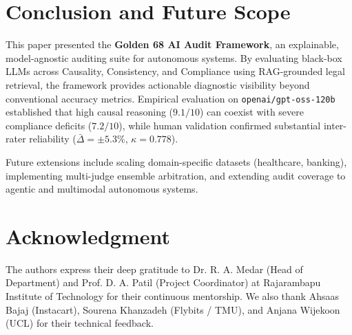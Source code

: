 \documentclass[conference]{IEEEtran}
\begin{document}
\section{Conclusion and Future Scope}
\label{sec:conclusion}

This paper presented the \textbf{Golden 68 AI Audit Framework}, an explainable, model-agnostic auditing suite for autonomous systems. By evaluating black-box LLMs across Causality, Consistency, and Compliance using RAG-grounded legal retrieval, the framework provides actionable diagnostic visibility beyond conventional accuracy metrics. Empirical evaluation on \texttt{openai/gpt-oss-120b} established that high causal reasoning ($9.1/10$) can coexist with severe compliance deficits ($7.2/10$), while human validation confirmed substantial inter-rater reliability ($\bar{\Delta} = \pm 5.3\%$, $\kappa = 0.778$).

Future extensions include scaling domain-specific datasets (healthcare, banking), implementing multi-judge ensemble arbitration, and extending audit coverage to agentic and multimodal autonomous systems.

\section*{Acknowledgment}
The authors express their deep gratitude to Dr. R. A. Medar (Head of Department) and Prof. D. A. Patil (Project Coordinator) at Rajarambapu Institute of Technology for their continuous mentorship. We also thank Ahsaas Bajaj (Instacart), Sourena Khanzadeh (Flybits / TMU), and Anjana Wijekoon (UCL) for their technical feedback.



\end{document}
